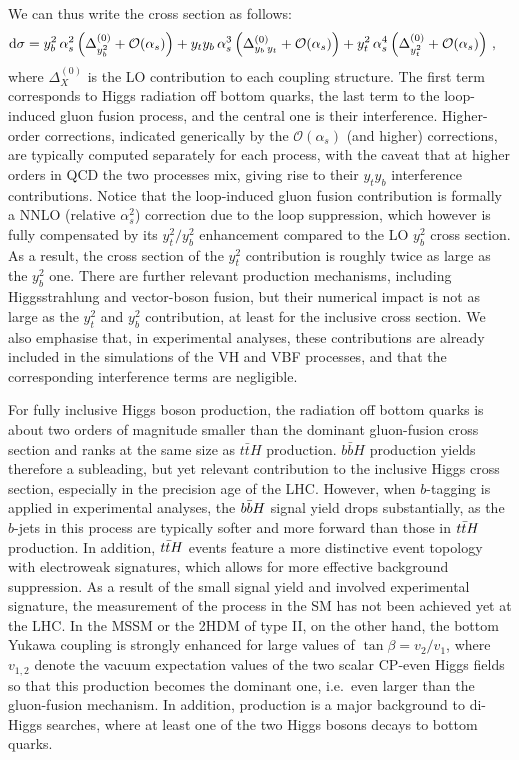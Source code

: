 \documentclass[11pt,a4paper]{article}
\begin{document}
We can thus write the \bbH{} cross section as follows:
\begin{equation}
\begin{split}
    {\rm d} \sigma & = y_b^2{}\,\alpha_s^2\left( \Delta_{y_b^2}^{(0)} + \mathcal O(\alpha_s) \right) +y_t y_b\, \alpha_s^3\left( \Delta_{y_b\, y_t}^{(0)} + \mathcal O(\alpha_s)  \right) + y_t^2{} \,\alpha_s^4\left( \Delta_{y_t^2}^{(0)} + \mathcal O(\alpha_s)  \right)\, ,
\end{split}
\label{eq:hbbxsec2}
\end{equation}
where $\Delta_{X}^{(0)}$ is the LO contribution to each coupling structure. The first term corresponds to Higgs radiation off bottom quarks, the last term
to the loop-induced gluon fusion process, and the central one is their interference. Higher-order corrections, indicated generically
by the $\mathcal O(\alpha_s)$ (and higher) corrections, 
are typically computed separately for each process, with the caveat that at higher orders in QCD the two processes mix, giving rise 
to their $y_t y_b$ interference contributions. Notice that the loop-induced gluon fusion contribution is formally a NNLO (relative $\alpha_s^2$) correction
due to the loop suppression, which however is fully compensated by its $y_t^2/y_b^2$ enhancement compared to the LO $y_b^2$ cross section.
As a result, the cross section of the $y_t^2$ contribution is roughly twice as large as the $y_b^2$ one.
There are further relevant \bbH{} production mechanisms, including Higgsstrahlung and vector-boson fusion, 
but their numerical impact is not as large as the $y_t^2$ and $y_b^2$ contribution, at least for the inclusive cross section. We also emphasise that, in experimental analyses, these contributions are already included in the simulations of the VH and VBF processes, and that the corresponding interference terms are negligible.

For fully inclusive Higgs boson production, the radiation off bottom quarks is about two orders of magnitude smaller than the dominant gluon-fusion cross section and ranks at the same size as $t\bar tH$ production. $b\bar bH$ production yields therefore a subleading, but yet relevant 
contribution to the inclusive Higgs cross section, especially in the precision age of the LHC. However, when $b$-tagging is applied in experimental analyses, the $b\bar{b}H{}$ signal yield drops substantially, as the $b$-jets in this process are typically softer and more forward than those in $t\bar{t}H{}$ production. In addition, $t\bar{t}H{}$ events feature a more distinctive event topology with electroweak signatures, which allows for more effective background suppression. As a result of the small signal yield and involved experimental signature,
the measurement of the \bbH{} process in the 
SM has not been achieved yet at the LHC. In the MSSM or the 2HDM of type II, on the other hand, the bottom Yukawa coupling is strongly enhanced for large values of $\tan\beta = v_2/v_1$, where $v_{1,2}$ denote the vacuum expectation values of the two scalar CP-even Higgs fields so that this production becomes the
dominant one, i.e.\ even larger than the gluon-fusion mechanism. In addition, \bbH{} production is a major background to di-Higgs searches, where at least 
one of the two Higgs bosons decays to bottom quarks.
\end{document}
